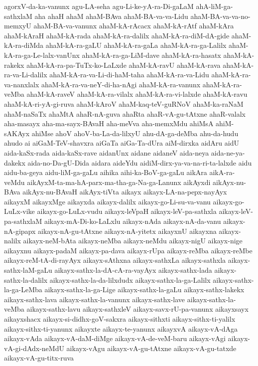{agorxV-da-ka-vanunx
agu-LA-seha
agu-Li-ke-yA-ra-Di-gaLaM
ahA-liM-ga-sathxlaM
aha
ahaH
ahaM
ahaM-BAva
ahaM-BA-va-va-Lidu
ahaM-BA-va-va-no-memxyU
ahaM-BA-va-vanunx
ahaM-kA-rAcacx
ahaM-kA-rAtf
ahaM-kAra
ahaM-kAraH
ahaM-kA-rada
ahaM-kA-ra-dalilx
ahaM-kA-ra-diM-dA-gide
ahaM-kA-ra-diMda
ahaM-kA-ra-gaLU
ahaM-kA-ra-gaLa
ahaM-kA-ra-ga-Lalilx
ahaM-kA-ra-ga-Le-lalx-vanUnx
ahaM-kA-ra-ga-LiM-dave
ahaM-kA-ra-hasatx
ahaM-kA-rakekx
ahaM-kA-ra-pa-TuTx-ko-LaLxde
ahaM-kA-ravU
ahaM-kA-rava
ahaM-kA-ra-va-Li-dalilx
ahaM-kA-ra-va-Li-di-haM-taha
ahaM-kA-ra-va-Lidu
ahaM-kA-ra-va-nanxlalx
ahaM-kA-ra-va-neY-di-ha-nAgi
ahaM-kA-ra-vanunx
ahaM-kA-ra-veMba
ahaM-kA-raveV
ahaM-kA-ra-vilalx
ahaM-kA-ra-vi-lalxde
ahaM-kA-ravu
ahaM-kA-ri-yA-gi-ruva
ahaM-kAroV
ahaM-kaq-teV-guRNoV
ahaM-ka-raNaM
ahaM-naSaTx
ahaMtA
ahaR-nA-guva
ahaRta
ahaR-vA-gu-tAtxne
ahaR-valalx
aha-masayx
aha-ma-sayx-BAvaH
aha-meVva
aha-memxMdu
ahiMsA
ahiM-sAKAyx
ahiMse
ahoV
ahoV-ba-La-da-lilxyU
ahu-dA-ga-deMba
ahu-da-hudu
ahudo
ai
aiGaM-TeV-shavxra
aiGaTa
aiGa-Ta-dUra
aiM-dirxka
aidAru
aidU
aida-kaSx-rada
aida-kaSx-rave
aidanUnx
aidane
aidaneV
aida-neya
aida-ne-ya-dakekx
aida-no-Da-gU-Dida
aidara
aideYdu
aidiM-dirx-ya-va-na-ri-ta-lalxde
aidu
aidu-ba-geya
aidu-liM-ga-gaLu
aihika
aihi-ka-BoV-ga-gaLu
aikAra
aikA-ra-veMdu
aikAyxM-ta-ma-hA-parx-ma-tha-ga-Na-ga-Lanunx
aikAyxdi
aikAyx-nu-BAva
aikAyx-nu-BAvaH
aikAyx-tiVta
aikayx
aikayx-LA-na-pepx-nayAyx
aikayxM
aikayxMge
aikayxda
aikayx-dalilx
aikayx-go-Li-su-va-vanu
aikayx-go-LuLx-vike
aikayx-go-LuLx-vudu
aikayx-leVpaH
aikayx-leV-pa-sathxla
aikayx-leV-pa-sathxlaM
aikayx-mA-Di-ko-LaLxlu
aikayx-nAda
aikayx-nA-da-vanu
aikayx-nA-gipapx
aikayx-nA-gu-tAtxne
aikayx-nA-yitetx
aikayxnU
aikayxna
aikayx-nalilx
aikayx-neM-bAta
aikayx-neMba
aikayx-neMdu
aikayx-nigU
aikayx-nige
aikayxnu
aikayx-padaM
aikayx-pa-dava
aikayx-rUpa
aikayx-reMba
aikayx-reMbe
aikayx-reM-tA-di-rayAyx
aikayx-sAthxna
aikayx-sathxLa
aikayx-sathxla
aikayx-sathx-laM-gaLu
aikayx-sathx-la-dA-cA-ra-vayAyx
aikayx-sathx-lada
aikayx-sathx-la-dalilx
aikayx-sathx-la-da-lilxdudx
aikayx-sathx-la-ga-Lalilx
aikayx-sathx-la-ga-LeMba
aikayx-sathx-la-ga-Lige
aikayx-sathx-la-gaLu
aikayx-sathx-lakekx
aikayx-sathx-lava
aikayx-sathx-la-vanunx
aikayx-sathx-lave
aikayx-sathx-la-veMba
aikayx-sathx-lavu
aikayx-sathxleV
aikayx-savx-rU-pa-vanunx
aikayxsayx
aikayxshacx
aikayx-si-didhx-goV-sakxra
aikayx-sithxti
aikayx-sithx-ti-yalilx
aikayx-sithx-ti-yanunx
aikayxte
aikayx-te-yanunx
aikayxvA
aikayx-vA-dAga
aikayx-vAda
aikayx-vA-daM-diMge
aikayx-vA-de-veM-baru
aikayx-vAgi
aikayx-vA-gi-dAdx-neMdU
aikayx-vAgu
aikayx-vA-gu-tAtxne
aikayx-vA-gu-tatxde
aikayx-vA-gu-titx-ruva
}
